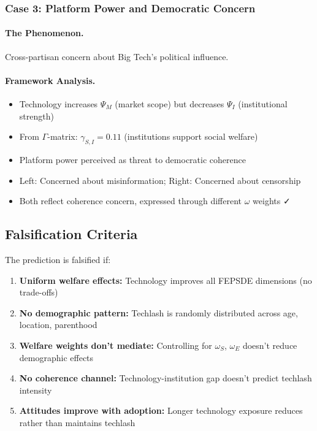 \subsubsection{Case 3: Platform Power and Democratic Concern}

\paragraph{The Phenomenon.}
Cross-partisan concern about Big Tech's political influence.

\paragraph{Framework Analysis.}
\begin{itemize}
    \item Technology increases $\Psi_M$ (market scope) but decreases $\Psi_I$ (institutional strength)
    \item From $\Gamma$-matrix: $\gamma_{S,I} = 0.11$ (institutions support social welfare)
    \item Platform power perceived as threat to democratic coherence
    \item Left: Concerned about misinformation; Right: Concerned about censorship
    \item Both reflect coherence concern, expressed through different $\omega$ weights ✓
\end{itemize}

\subsection{Falsification Criteria}

The prediction is falsified if:

\begin{enumerate}
    \item \textbf{Uniform welfare effects:} Technology improves all FEPSDE dimensions 
    (no trade-offs)
    
    \item \textbf{No demographic pattern:} Techlash is randomly distributed across 
    age, location, parenthood
    
    \item \textbf{Welfare weights don't mediate:} Controlling for $\omega_S$, $\omega_E$ 
    doesn't reduce demographic effects
    
    \item \textbf{No coherence channel:} Technology-institution gap doesn't predict 
    techlash intensity
    
    \item \textbf{Attitudes improve with adoption:} Longer technology exposure reduces 
    rather than maintains techlash
\end{enumerate}

